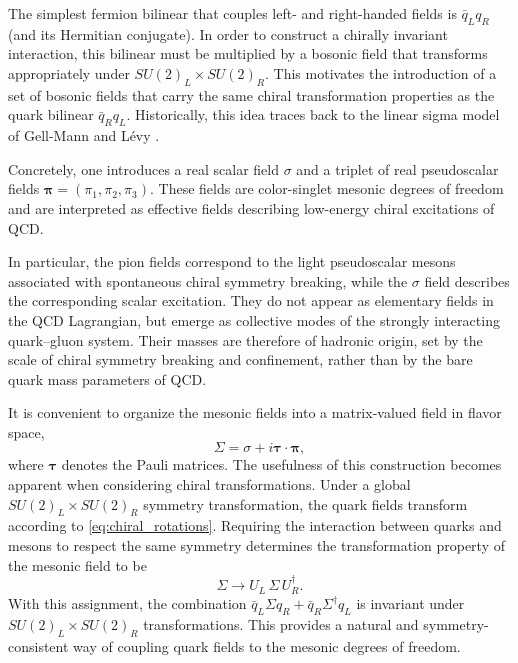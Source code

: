 The simplest fermion bilinear that couples left- and right-handed
fields is $\bar{q}_L q_R$ (and its Hermitian conjugate). In order to
construct a chirally invariant interaction, this bilinear must be
multiplied by a bosonic field that transforms appropriately under
$SU(2)_L \times SU(2)_R$. This motivates the introduction of a set of
bosonic fields that carry the same chiral transformation properties
as the quark bilinear $\bar{q}_R q_L$. Historically, this idea traces
back to the linear sigma model of Gell-Mann and L\'evy
\cite{GellMannLevy1960}.

Concretely, one introduces a real scalar field $\sigma$ and a triplet
of real pseudoscalar fields $\boldsymbol{\pi} = (\pi_1,\pi_2,\pi_3)$. 
These fields are color-singlet mesonic degrees of freedom and are 
interpreted as effective fields describing low-energy chiral 
excitations of QCD.

In particular, the pion fields correspond to the light pseudoscalar
mesons associated with spontaneous chiral symmetry breaking, while the
$\sigma$ field describes the corresponding scalar excitation. They do
not appear as elementary fields in the QCD Lagrangian, but emerge as
collective modes of the strongly interacting quark–gluon system. Their
masses are therefore of hadronic origin, set by the scale of chiral
symmetry breaking and confinement, rather than by the bare quark mass
parameters of QCD.

It is convenient to organize the mesonic fields into a matrix-valued
field in flavor space,
\begin{equation}
\Sigma = \sigma + i \boldsymbol{\tau}\cdot\boldsymbol{\pi},
\label{eq:sigma_def}
\end{equation}
where $\boldsymbol{\tau}$ denotes the Pauli matrices. The usefulness of
this construction becomes apparent when considering chiral
transformations. Under a global $SU(2)_L \times SU(2)_R$ symmetry
transformation, the quark fields transform according to \eqref{eq:chiral_rotations}.
Requiring the interaction between quarks and
mesons to respect the same symmetry determines the transformation
property of the mesonic field to be
\begin{equation}
\Sigma \rightarrow U_L\, \Sigma\, U_R^\dagger .
\end{equation}
With this assignment, the combination
$\bar{q}_L \Sigma q_R + \bar{q}_R \Sigma^\dagger q_L$
is invariant under $SU(2)_L \times SU(2)_R$ transformations. This
provides a natural and symmetry-consistent way of coupling quark
fields to the mesonic degrees of freedom.

